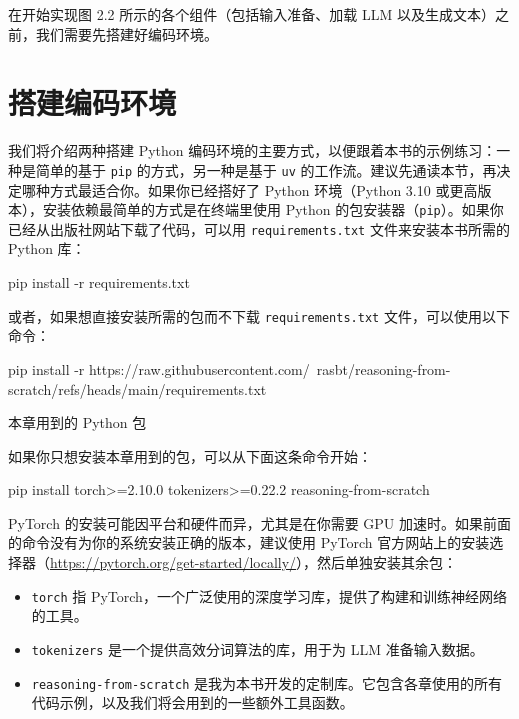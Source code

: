 在开始实现图 2.2 所示的各个组件（包括输入准备、加载 LLM 以及生成文本）之前，我们需要先搭建好编码环境。

\section{搭建编码环境}

我们将介绍两种搭建 Python 编码环境的主要方式，以便跟着本书的示例练习：一种是简单的基于 \texttt{pip} 的方式，另一种是基于 \texttt{uv} 的工作流。建议先通读本节，再决定哪种方式最适合你。如果你已经搭好了 Python 环境（Python 3.10 或更高版本），安装依赖最简单的方式是在终端里使用 Python 的包安装器（\texttt{pip}）。如果你已经从出版社网站下载了代码，可以用 \texttt{requirements.txt} 文件来安装本书所需的 Python 库：

\begin{codebox}
pip install -r requirements.txt
\end{codebox}

或者，如果想直接安装所需的包而不下载 \texttt{requirements.txt} 文件，可以使用以下命令：

\begin{codebox}
pip install -r https://raw.githubusercontent.com/\
rasbt/reasoning-from-scratch/refs/heads/main/requirements.txt
\end{codebox}

\begin{mySidebar}{本章用到的 Python 包}

如果你只想安装本章用到的包，可以从下面这条命令开始：

\begin{codebox}
pip install torch>=2.10.0 tokenizers>=0.22.2 reasoning-from-scratch
\end{codebox}

PyTorch 的安装可能因平台和硬件而异，尤其是在你需要 GPU 加速时。如果前面的命令没有为你的系统安装正确的版本，建议使用 PyTorch 官方网站上的安装选择器（\href{https://pytorch.org/get-started/locally/}{https://pytorch.org/get-started/locally/}），然后单独安装其余包：

\begin{itemize}
\item \texttt{torch} 指 PyTorch，一个广泛使用的深度学习库，提供了构建和训练神经网络的工具。
\item \texttt{tokenizers} 是一个提供高效分词算法的库，用于为 LLM 准备输入数据。
\item \texttt{reasoning-from-scratch} 是我为本书开发的定制库。它包含各章使用的所有代码示例，以及我们将会用到的一些额外工具函数。
\end{itemize}

\end{mySidebar}

